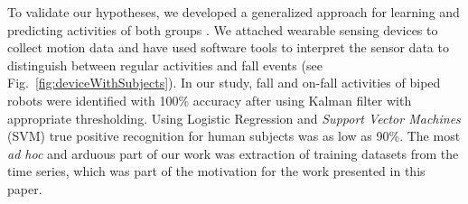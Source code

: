 \documentclass{IEEEtran}
\begin{document}
\par
To validate our hypotheses, we developed a generalized approach for learning 
and predicting activities of both groups \cite{abeyruwanFlairs2015}.  We attached wearable sensing devices to collect
motion data and have used software tools to interpret the sensor data to distinguish 
between regular activities and fall events (see Fig.~\ref{fig:deviceWithSubjects}). 
In our study, fall and on-fall activities of biped robots were identified with 100\%  accuracy after using Kalman filter \cite{Welch:1995:IKF:897831} with appropriate thresholding.  Using Logistic Regression and \emph{Support Vector Machines} (SVM) true positive recognition for human subjects was as low as 90\%. The most \emph{ad hoc} and arduous part of our work was extraction of training datasets from the time series, which was part of the motivation for the work presented in this paper.

%



\end{document}
